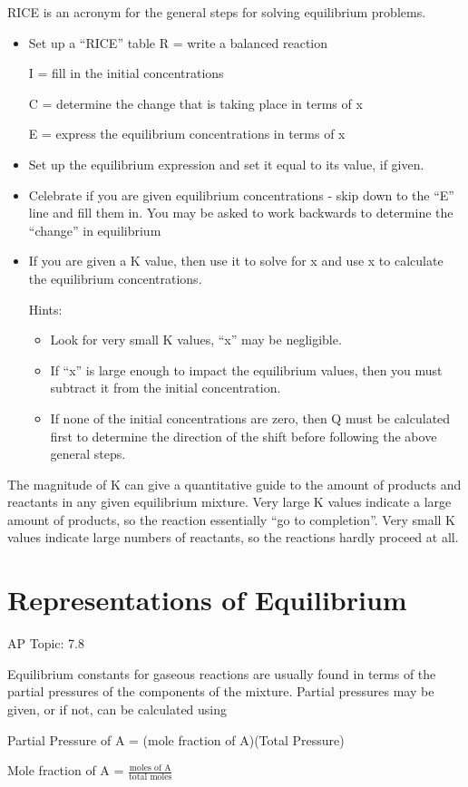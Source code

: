 \documentclass[../chem.tex]{subfiles}
\begin{document}
RICE is an acronym for the general steps for solving equilibrium problems.
\begin{itemize}
    \item Set up a ``RICE'' table
    R = write a balanced reaction 

    I = fill in the initial concentrations 

    C = determine the change that is taking place in terms of x

    E = express the equilibrium concentrations in terms of x 
    \item Set up the equilibrium expression and set it equal to its value, if given.
    \item Celebrate if you are given equilibrium concentrations - skip down to the ``E'' line and fill them in. You may be asked to work backwards to determine the ``change'' in equilibrium 
    \item If you are given a K value, then use it to solve for x and use x to calculate the equilibrium concentrations.
    
    Hints:
    \begin{itemize}
        \item Look for very small K values, ``x'' may be negligible.
        \item If ``x'' is large enough to impact the equilibrium values, then you must subtract it from the initial concentration. 
        \item If none of the initial concentrations are zero, then Q must be calculated first to determine the direction of the shift before following the above general steps.
    \end{itemize}
\end{itemize}

The magnitude of K can give a quantitative guide to the amount of products and reactants in any given equilibrium mixture. 
Very large K values indicate a large amount of products, so the reaction essentially ``go to completion''. Very small K values indicate 
large numbers of reactants, so the reactions hardly proceed at all.
\section{Representations of Equilibrium}
AP Topic: 7.8

Equilibrium constants for gaseous reactions are usually found in terms of the partial pressures of the components of the mixture. 
Partial pressures may be given, or if not, can be calculated using 
\begin{center}
    Partial Pressure of A = (mole fraction of A)(Total Pressure)
\end{center}
\begin{center}
    Mole fraction of A = $\frac{\text{moles of A}}{\text{total moles}}$
\end{center}
\end{document}
